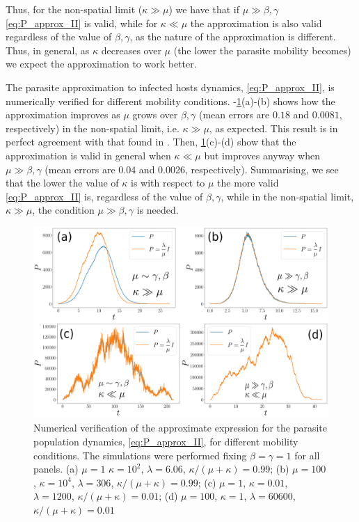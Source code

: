 Thus, for the non-spatial limit ($\kappa\gg\mu$) we have that if
$\mu\gg\beta,\gamma$ \cref{eq:P_approx_II} is valid, while for $\kappa\ll\mu$
the
approximation is also valid regardless of the value of $\beta,\gamma$, as the
nature of the approximation is different. Thus, in general, as $\kappa$
decreases over $\mu$ (the lower the parasite mobility becomes) we expect the
approximation to work better.

The parasite approximation to infected hosts dynamics, \cref{eq:P_approx_II},
is numerically verified for different mobility conditions.
-\cref{fig:P_approx}(a)-(b) shows how the approximation improves as $\mu$ grows
over $\beta,\gamma$ (mean errors are $0.18$ and $0.0081$, respectively) in the
non-spatial limit, i.e. $\kappa\gg\mu$, as expected. This result is in perfect
agreement with that found in \cite{GimenezRomero2021}. Then,
\cref{fig:P_approx}(c)-(d) show that the approximation is valid in general when
$\kappa\ll\mu$ but improves anyway when $\mu\gg\beta,\gamma$ (mean errors are
0.04 and 0.0026, respectively). Summarising, we see that the lower the value of
$\kappa$ is with respect to $\mu$ the more valid \cref{eq:P_approx_II} is,
regardless of the value of $\beta,\gamma$, while in the non-spatial limit,
$\kappa\gg\mu$, the condition $\mu\gg\beta,\gamma$ is needed.

\begin{figure}[H]
    \centering
    \includegraphics[width=\columnwidth]{Figures/P_approx.png}
    \caption{Numerical verification of the approximate expression for the
        parasite population dynamics, \cref{eq:P_approx_II}, for different
        mobility
        conditions. The simulations were performed fixing $\beta=\gamma=1$  for
        all
        panels. (a) $\mu=1$ $\kappa=10^2$, $\lambda=6.06$,
        $\kappa/(\mu+\kappa)=0.99$;
        (b) $\mu=100$, $\kappa=10^4$, $\lambda=306$,
        $\kappa/(\mu+\kappa)=0.99$; (c)
        $\mu=1$, $\kappa=0.01$, $\lambda=1200$, $\kappa/(\mu+\kappa)=0.01$; (d)
        $\mu=100$, $\kappa=1$, $\lambda=60600$,  $\kappa/(\mu+\kappa)=0.01$}
    \label{fig:P_approx}
\end{figure}

